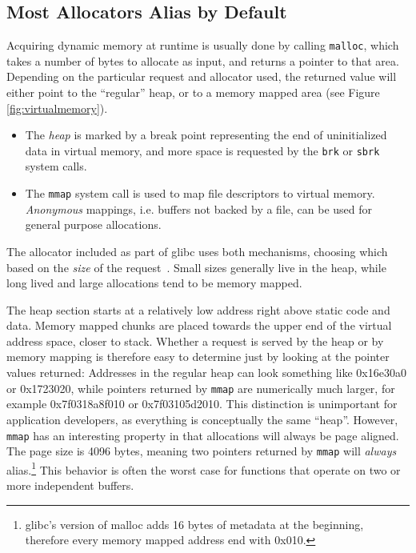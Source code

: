\documentclass[prodmode,acmtaco]{acmsmall}
\begin{document}
\subsection{Most Allocators Alias by Default}
Acquiring dynamic memory at runtime is usually done by calling \texttt{malloc}, which takes a number of bytes to allocate as input, and returns a pointer to that area.
Depending on the particular request and allocator used, the returned value will either point to the ``regular'' heap, or to a memory mapped area (see Figure \ref{fig:virtualmemory}).
\begin{itemize}
  \item The \emph{heap} is marked by a break point representing the end of uninitialized data in virtual memory, and more space is requested by the \texttt{brk} or \texttt{sbrk} system calls.
  \item The \texttt{mmap} system call is used to map file descriptors to virtual memory. \emph{Anonymous} mappings, i.e. buffers not backed by a file, can be used for general purpose allocations.
\end{itemize}
The allocator included as part of glibc uses both mechanisms, choosing which based on the \emph{size} of the request~\cite{GlibcManual}.
Small sizes generally live in the heap, while long lived and large allocations tend to be memory mapped.

The heap section starts at a relatively low address right above static code and data.
Memory mapped chunks are placed towards the upper end of the virtual address space, closer to stack.
Whether a request is served by the heap or by memory mapping is therefore easy to determine just by looking at the pointer values returned:
Addresses in the regular heap can look something like 0x16e30a0 or 0x1723020, while pointers returned by \texttt{mmap} are numerically much larger, for example 0x7f0318a8f010 or 0x7f03105d2010.
This distinction is unimportant for application developers, as everything is conceptually the same ``heap''.
However, \texttt{mmap} has an interesting property in that allocations will always be page aligned.
The page size is 4096 bytes, meaning two pointers returned by \texttt{mmap} will \emph{always} alias.\footnote{glibc's version of malloc adds 16 bytes of metadata at the beginning, therefore every memory mapped address end with 0x010.}
This behavior is often the worst case for functions that operate on two or more independent buffers.
\end{document}

